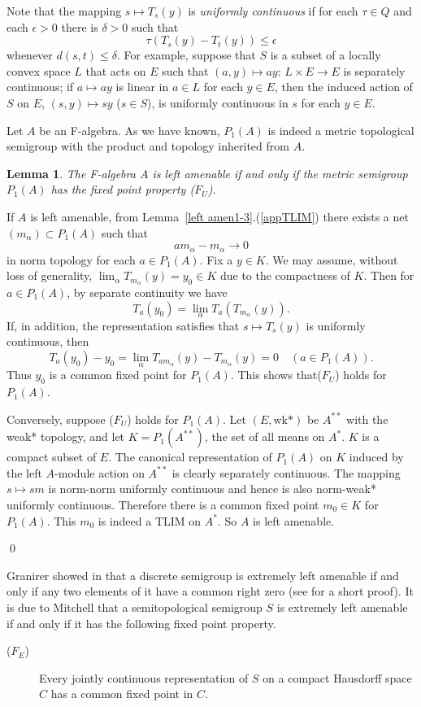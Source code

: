 \documentclass{tran-l}
\numberwithin{equation}{section}
\newtheorem{lemma}[thm]{Lemma}
\theoremstyle{definition}
\theoremstyle{remark}
\begin{document}
Note that the mapping $s \mapsto T_s(y)$ is \emph{uniformly continuous} if for each $\tau\in Q$ and each $\epsilon >0$ there is $\delta>0$ such that 
\[
\tau(T_s(y) - T_t(y)) \leq \epsilon
\]
 whenever $d(s,t) \leq \delta$. For example, suppose that $S$ is a subset of a locally convex space $L$ that acts on $E$ such that $(a,y)\mapsto ay$: $L\times E \to E$ is separately continuous; if $a\mapsto ay$ is linear in $a\in L$ for each $y\in E$, then the induced action of $S$ on $E$, $(s,y)\mapsto sy$ ($s\in S$), is uniformly continuous in $s$ for each $y\in E$.
 
 
Let $A$ be an F-algebra. As we have known, $P_1(A)$ is indeed a metric topological semigroup with the product and topology inherited from $A$.

\begin{lemma}\label{fixed pt}
The F-algebra $A$ is left amenable if and only if the metric semigroup $P_1(A)$ has the fixed point property ($F_U$).
\end{lemma}
\proof
If $A$ is left amenable, from Lemma~\ref{left amen1-3}.(\ref{appTLIM}) there exists a net $(m_{\alpha})\subset P_1(A)$ such that 
\[
am_{\alpha} - m_{\alpha} \to 0
\]
 in norm topology for each $a\in P_1(A)$. Fix a $y\in K$. We may assume, without loss of generality, $\lim_{\alpha} T_{m_{\alpha}} (y) = y_0 \in K$ due to the compactness of $K$. Then for $a\in P_1(A)$, by separate continuity we have 
 \[
 T_a(y_0) = \lim_{\alpha} T_a(T_{m_{\alpha}}(y)).
 \]
  If, in addition, the representation satisfies that $s\mapsto T_s(y)$ is uniformly continuous, then
\[
T_a(y_0) - y_0 = \lim_{\alpha} T_{am_{\alpha}}(y) - T_{m_{\alpha}}(y) = 0 \quad (a\in P_1(A)).
\]
Thus $y_0$ is a common fixed point for $P_1(A)$. This shows that($F_U$) holds for $P_1(A)$.

Conversely, suppose ($F_U$) holds for  $P_1(A)$. Let $(E ,\text{wk*})$ be  $A^{**}$ with the weak* topology, and let $K=P_1(A^{**})$, the set of all means on $A^*$. $K$ is a compact subset of $E$. The canonical representation of $P_1(A)$ on $K$ induced by the left $A$-module action on $A^{**}$ is clearly separately continuous. The mapping $s\mapsto sm$ is norm-norm uniformly continuous and hence is also norm-weak* uniformly continuous. Therefore there is a common fixed point $m_0\in K$ for $P_1(A)$. This $m_0$ is indeed a TLIM on $A^*$. So $A$ is left amenable.

\qed

Granirer showed in \cite{Gran_ELA} that a discrete semigroup is extremely left amenable if and only if any two elements of it have a common right zero (see \cite[Theorem~4.2]{Lau-Z} for a short proof). It is due to  Mitchell \cite{Mitch_LUC} that a semitopological semigroup $S$ is extremely left amenable if and only if it has the following fixed point property.
\begin{description}
\item[($F_E$)] Every jointly continuous representation of $S$ on a compact Hausdorff space $C$ has a common fixed point in $C$.
\end{description}
\end{document}
